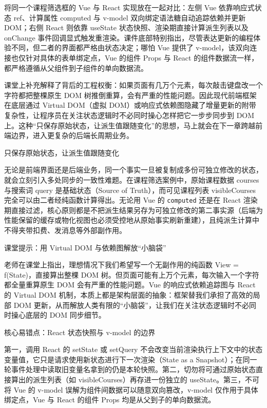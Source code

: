 \documentclass[UTF8,a4paper,11pt,fontset=fandol]{ctexart}
\begin{document}
将同一个课程筛选框的 Vue 与 React 实现放在一起对比：左侧 Vue 依靠响应式状态 ref、计算属性 computed 与 v-model 双向绑定语法糖自动追踪依赖并更新 DOM；右侧 React 则依靠 useState 状态快照、渲染期直接计算派生列表以及 onChange 事件回调显式触发重渲染。课件底部特别指出，尽管表达更新的编程体验不同，但二者的界面都严格由状态决定；哪怕 Vue 提供了 v-model，该双向连接也仅针对具体的表单绑定点，Vue 的组件 Props 与 React 的组件数据流一样，都严格遵循从父组件到子组件的单向数据流。

课堂上补充解释了背后的工程权衡：如果页面有几万个元素，每次敲击键盘改一个字符都把整棵原生 DOM 树推倒重算，会有严重的性能问题。因此现代前端框架在底层通过 Virtual DOM（虚拟 DOM）或响应式依赖图隐藏了增量更新的附带复杂性，让程序员在关注状态逻辑时不必同时操心怎样把它一步步同步到 DOM 上。这种“只保存原始状态，让派生值跟随变化”的思想，马上就会在下一章跨越前端边界，进入更复杂的后端长周期业务。

\begin{importantbox}{只保存原始状态，让派生值跟随变化}

无论是前端界面还是后端业务，同一个事实一旦被复制成多份可独立修改的状态，就会立刻引入多处同步的一致性难题。在课程筛选案例中，原始课程数据 courses 与搜索词 query 是基础状态（Source of Truth），而可见课程列表 visibleCourses 完全可以由二者经纯函数计算得出。无论用 Vue 的 \texttt{computed} 还是在 React 渲染期直接过滤，核心原则都是不把派生结果另存为可独立修改的第二事实源（后端为性能保留的缓存或物化视图也必须受控地从原始事实刷新重建），且纯派生计算中不得夹带扣费、发消息等外部副作用。

\end{importantbox}

\begin{knowledgebox}{课堂提示：用 Virtual DOM 与依赖图解放“小脑袋”}

老师在课堂上指出，理想情况下我们希望写一个无副作用的纯函数 View = f(State)，直接算出整棵 DOM 树。但页面可能有上万个元素，每次输入一个字符都全量重算原生 DOM 会有严重的性能问题。Vue 的响应式依赖追踪图与 React 的 Virtual DOM 机制，本质上都是架构层面的抽象：框架替我们承担了高效的局部 DOM 更新，从而解放人类有限的“小脑袋”，让我们在关注状态逻辑时不必同时操心底层的 DOM 同步细节。

\end{knowledgebox}

\begin{warningbox}{核心易错点：React 状态快照与 v-model 的边界}

第一，调用 React 的 setState 或 setQuery 不会改变当前渲染执行上下文中的状态变量值，它只是请求使用新状态进行下一次渲染（State as a Snapshot）；在同一轮事件处理中读取旧变量名拿到的仍是本轮快照。第二，切勿将可通过原始状态直接算出的派生列表（如 visibleCourses）再存进一份独立的 useState。第三，不可将 Vue 的 v-model 误解为组件间数据可以随意双向篡改，v-model 仅作用于具体绑定点，Vue 与 React 的组件 Props 均是从父到子的单向数据流。

\end{warningbox}
\end{document}

